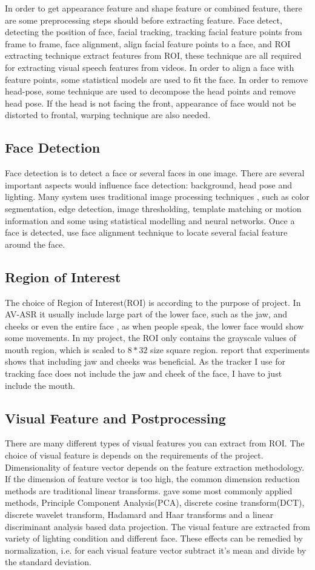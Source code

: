 In order to get appearance feature and shape feature or combined feature, there are some preprocessing steps should before extracting feature. Face detect, detecting the position of face, facial tracking, tracking facial feature points from frame to frame, face alignment, align facial feature points to a face, and ROI extracting technique extract features from ROI, these technique are all required for extracting visual speech features from videos. In order to align a face with feature points, some statistical models are used to fit the face. In order to remove head-pose, some technique are used to decompose the head points and remove head pose. If the head is not facing the front, appearance of face would not be distorted to frontal, warping technique are also needed.
\subsection{Face Detection}
Face detection is to detect a face or several faces in one image. There are several important aspects would influence face detection: background, head pose and lighting. Many system uses traditional image processing techniques\cite{potamianos2003recent} , such as color segmentation, edge detection, image thresholding, template matching or motion information and some using statistical modelling and neural networks. Once a face is detected, use face alignment technique to locate several facial feature around the face.
\subsection{Region of Interest}
The choice of Region of Interest(ROI) is according to the purpose of project. In AV-ASR it usually include large part of the lower face, such as the jaw, and cheeks or even the entire face \cite{potamianos2003recent}, as when people speak, the lower face would show some movements. In my project, the ROI only contains the grayscale values of mouth region, which is scaled to $8 * 32$ size square region. \cite{potamianos2003recent} report that experiments shows that including jaw and cheeks was beneficial. As the tracker I use for tracking face does not include the jaw and cheek of the face, I have to just include the mouth.
\subsection{Visual Feature and Postprocessing}
There are many different types of visual features you can extract from ROI. The choice of visual feature is depends on the requirements of the project. Dimensionality of feature vector depends on the feature extraction methodology. If the dimension of feature vector is too high, the common dimension reduction methods are traditional linear transforms. \cite{potamianos2003recent} gave some most commonly applied methods, Principle Component Analysis(PCA), discrete cosine transform(DCT), discrete wavelet transform, Hadamard and Haar transforms and a linear discriminant analysis based data projection. The visual feature are extracted from variety of lighting condition and different face. These effects can be remedied by normalization, i.e. for each visual feature vector subtract it's mean and divide by the standard deviation.
